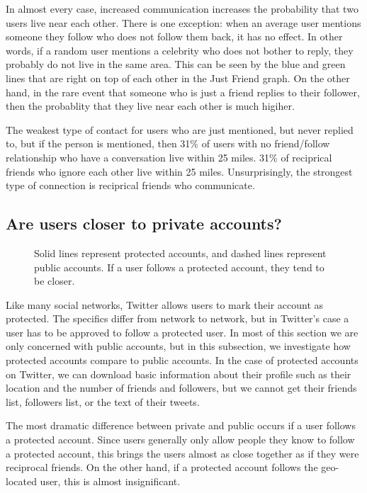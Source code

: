 \documentclass{sig-alternate}
\begin{document}
In almost every case, increased communication increases the probability that two users live near each other. There is one exception: when an average user mentions someone they follow who does not follow them back, it has no effect.
In other words, if a random user mentions a celebrity who does not bother to reply, they probably do not live in the same area. This can be seen by the blue and green lines that are right on top of each other in the Just Friend graph.
On the other hand, in the rare event that someone who is just a friend replies
to their follower, then the probablity that they live near each other is much higiher.

The weakest type of contact for users who are just mentioned, but never replied to, but if the person is mentioned, then 31\% of users with no friend/follow relationship who have a conversation live within 25 miles.
31\% of reciprical friends who ignore each other live within 25 miles.
Unsurprisingly, the strongest type of connection is reciprical friends who communicate.

\subsection{Are users closer to private accounts?}
\begin{figure}
\centering
{}
\caption{Solid lines represent protected accounts, and dashed lines represent
public accounts. If a user follows a protected account, they tend to be closer.}
\label{fig:EdgeTypesProt}
\end{figure}

Like many social networks, Twitter allows users to mark their account as protected. The specifics differ from network to network, but in Twitter's case a user has to be approved to follow a protected user.
In most of this section we are only concerned with public accounts, but in this subsection, we investigate how protected accounts compare to public accounts.
In the case of protected accounts on Twitter, we can download basic information
about their profile such as their location and the number of friends and
followers, but we cannot get their friends list, followers list, or the text of their tweets.

The most dramatic difference between private and public occurs if a user follows a protected account.
Since users generally only allow people they know to follow a protected account, this brings the users almost as close together as if they were reciprocal friends. On the other hand, if a protected account follows the geo-located user, this is almost insignificant.
\end{document}
